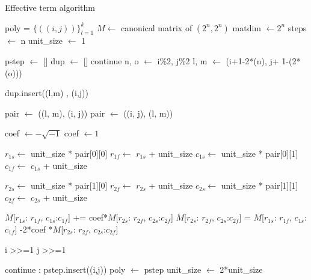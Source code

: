 \documentclass[twocolumn]{article}
\begin{document}
\begin{algorithm}
    \caption{Effective term algorithm}\label{alg:effective_terms}
    \begin{algorithmic}
        \Require poly = $\{((i, j))\}_{l=1}^k$ 
        \Require $M \gets$ canonical matrix of $(2^n, 2^n)$
        \State matdim $\gets 2^n$
        \State steps $\gets$ n
        \State unit\_size $\gets$ 1
        
            \State pstep $\gets$ [] 
            \State dup   $\gets$ []
                    continue
                \EndIf
                \State n, o $\gets$ i\%2, j\%2  
                \State l, m $\gets$ (i+1-2*(n), j+ 1-(2*(o))) 
                
                \State dup.insert((l,m) , (i,j))
                
                    \State pair $\gets$ ((l, m), (i, j))
                \Else
                    \State pair $\gets$ ((i, j), (l, m))
                \EndIf

                    \State coef $\gets - \sqrt{-1}$ 
                \Else
                    \State coef $\gets 1$
                \EndIf

                \State $r_{1s}\gets$ unit\_size * pair[0][0]
                \State $r_{1f}\gets$ $r_{1s}$ + unit\_size
                \State $c_{1s}\gets$ unit\_size * pair[0][1]
                \State $c_{1f}\gets$ $c_{1s}$ + unit\_size

                \State $r_{2s}\gets$ unit\_size * pair[1][0]
                \State $r_{2f}\gets$ $r_{2s}$ + unit\_size
                \State $c_{2s}\gets$ unit\_size * pair[1][1]
                \State $c_{2f}\gets$ $c_{2s}$ + unit\_size

                \State $M$[$r_{1s}$: $r_{1f}$, $c_{1s}$:$c_{1f}$] += coef*$M$[$r_{2s}$: $r_{2f}$, $c_{2s}$:$c_{2f}$]
                \State $M$[$r_{2s}$: $r_{2f}$, $c_{2s}$:$c_{2f}$] = $M$[$r_{1s}$: $r_{1f}$, $c_{1s}$:$c_{1f}$] -2*coef *$M$[$r_{2s}$: $r_{2f}$, $c_{2s}$:$c_{2f}$]

                \State i >>=1 
                \State j >>=1

                    continue
                \Else:
                    pstep.insert((i,j))
                \EndIf
            \EndFor
            \State poly $\gets$ pstep
            \State unit\_size $\gets$ 2*unit\_size
        \EndFor
    \end{algorithmic}
\end{algorithm}
\end{document}
